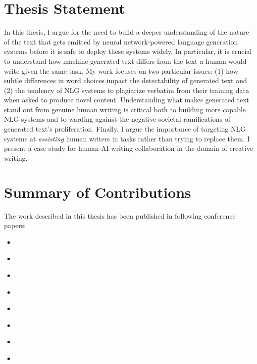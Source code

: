 \section{Thesis Statement}
In this thesis, I argue for the need to build a deeper understanding of the nature of the text that gets emitted by neural network-powered language generation systems before it is safe to deploy these systems widely.
In particular, it is crucial to understand how machine-generated text differs from the text a human would write given the same task.
My work focuses on two particular issues: (1) how subtle differences in word choices impact the detectability of generated text and (2) the tendency of NLG systems to plagiarize verbatim from their training data when asked to produce novel content.
Understanding what makes generated text stand out from genuine human writing is critical both to building more capable NLG systems and to warding against the negative societal ramifications of generated text's proliferation.
Finally, I argue the importance of targeting NLG systems at \textit{assisting} human writers in tasks rather than trying to replace them.
I present a case study for human-AI writing collaboration in the domain of creative writing.

\section{Summary of Contributions}
The work described in this thesis has been published in following conference papers:

\begin{itemize}
  \item \cite{ippolito2019comparison} 
  \item \cite{ippolito2020automatic} 
  \item \cite{lee2021deduplicating} 
  \item \cite{reif2021recipe} 
  \item \cite{wordcraft} 
  \item \cite{yuan2022wordcraft} 
  \item \cite{carlini2022quantifying} 
  \item \cite{dugan2020roft} 
\end{itemize}



